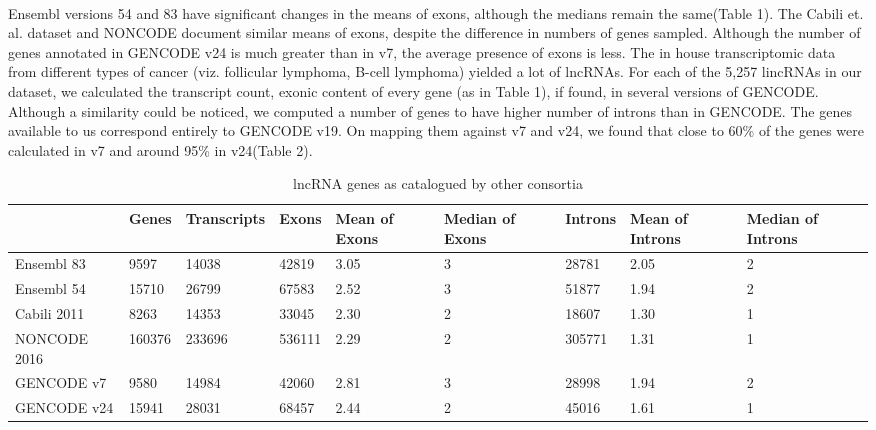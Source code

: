 \documentclass[ncrna,article,submit,moreauthors,pdftex,10pt,a4paper]{mdpi}
\begin{document}
 \paragraph{}
  Ensembl versions 54 and 83 have significant changes in the means of exons, although the medians remain the same(Table 1). The Cabili et. al. dataset and NONCODE document similar means of exons, despite the difference in numbers of genes sampled. Although the number of genes annotated in GENCODE v24 is much greater than in v7, the average presence of exons is less.
 The in house transcriptomic data from different types of cancer (viz. follicular lymphoma, B-cell lymphoma) yielded a lot of lncRNAs. 
 For each of the 5,257 lincRNAs in our dataset, we calculated the transcript count, exonic content of every gene (as in Table 1), if found, in several versions of GENCODE. Although a similarity could be noticed, we computed a number of genes to have higher number of introns than in GENCODE.
  The genes available to us correspond entirely to GENCODE v19.
  On mapping them against v7 and v24, we found that close to 60\% of the genes
 were calculated in v7 and around 95\% in v24(Table 2).

\begin{table}[ht]
\caption{lncRNA genes as catalogued by other consortia} 
\centering
{\tiny
\begin{tabular}[lrrrrrrrr]{p{}|p{}p{}p{}p{}
p{}p{}p{}p{}}
  \hline
 & Genes & Transcripts & Exons & Mean of Exons & Median of Exons & Introns & Mean of Introns & Median of Introns \\ 
   \hline
Ensembl 83 & 9597 & 14038 & 42819 & 3.05 &   3 & 28781 & 2.05 &   2 \\ 
  Ensembl 54 & 15710 & 26799 & 67583 & 2.52 &   3 & 51877 & 1.94 &   2 \\ 
  Cabili 2011 & 8263 & 14353 & 33045 & 2.30 &   2 & 18607 & 1.30 &   1 \\ 
  NONCODE 2016 & 160376 & 233696 & 536111 & 2.29 &   2 & 305771 & 1.31 &   1 \\ 
  GENCODE v7 & 9580 & 14984 & 42060 & 2.81 &   3 & 28998 & 1.94 &   2 \\ 
  GENCODE v24 & 15941 & 28031 & 68457 & 2.44 &   2 & 45016 & 1.61 &   1 \\ 
   \hline
\end{tabular}
}
\end{table}%
\end{document}
